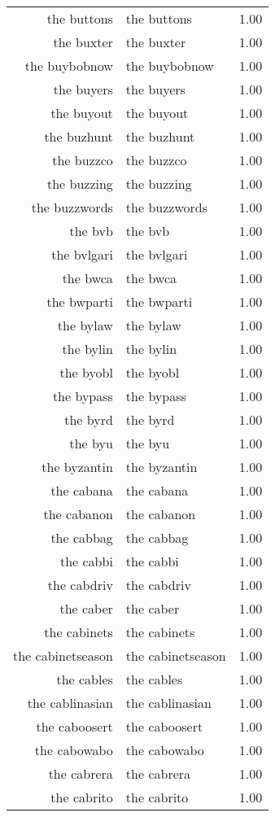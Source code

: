 \begin{table}[ht]
\begin{tabular}{rlr}
  the buttons & the buttons & 1.00 \\ 
  the buxter & the buxter & 1.00 \\ 
  the buybobnow & the buybobnow & 1.00 \\ 
  the buyers & the buyers & 1.00 \\ 
  the buyout & the buyout & 1.00 \\ 
  the buzhunt & the buzhunt & 1.00 \\ 
  the buzzco & the buzzco & 1.00 \\ 
  the buzzing & the buzzing & 1.00 \\ 
  the buzzwords & the buzzwords & 1.00 \\ 
  the bvb & the bvb & 1.00 \\ 
  the bvlgari & the bvlgari & 1.00 \\ 
  the bwca & the bwca & 1.00 \\ 
  the bwparti & the bwparti & 1.00 \\ 
  the bylaw & the bylaw & 1.00 \\ 
  the bylin & the bylin & 1.00 \\ 
  the byobl & the byobl & 1.00 \\ 
  the bypass & the bypass & 1.00 \\ 
  the byrd & the byrd & 1.00 \\ 
  the byu & the byu & 1.00 \\ 
  the byzantin & the byzantin & 1.00 \\ 
  the cabana & the cabana & 1.00 \\ 
  the cabanon & the cabanon & 1.00 \\ 
  the cabbag & the cabbag & 1.00 \\ 
  the cabbi & the cabbi & 1.00 \\ 
  the cabdriv & the cabdriv & 1.00 \\ 
  the caber & the caber & 1.00 \\ 
  the cabinets & the cabinets & 1.00 \\ 
  the cabinetseason & the cabinetseason & 1.00 \\ 
  the cables & the cables & 1.00 \\ 
  the cablinasian & the cablinasian & 1.00 \\ 
  the caboosert & the caboosert & 1.00 \\ 
  the cabowabo & the cabowabo & 1.00 \\ 
  the cabrera & the cabrera & 1.00 \\ 
  the cabrito & the cabrito & 1.00 \\ 

\end{tabular}
\end{table}
